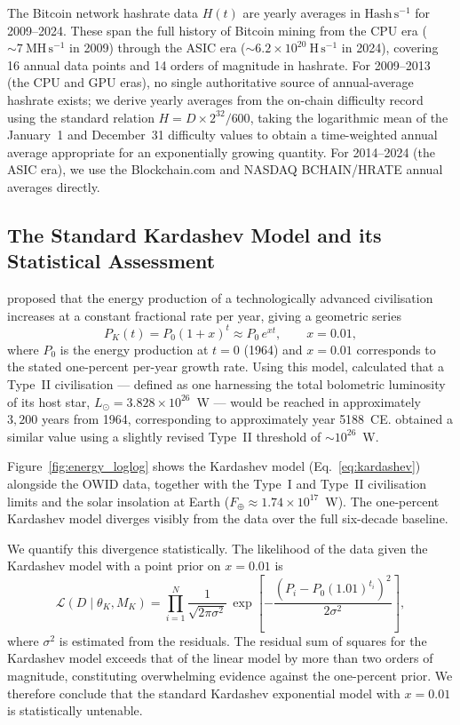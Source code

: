 The Bitcoin network hashrate data $H(t)$ are yearly averages in $\mathrm{Hash\,s^{-1}}$
for 2009--2024. These span the full history of Bitcoin mining from the CPU era
($\sim7~\mathrm{MH\,s^{-1}}$ in 2009) through the ASIC era
($\sim6.2\times10^{20}~\mathrm{H\,s^{-1}}$ in 2024), covering 16 annual data points and
14 orders of magnitude in hashrate. For 2009--2013 (the CPU and GPU eras), no single
authoritative source of annual-average hashrate exists; we derive yearly averages from
the on-chain difficulty record using the standard relation $H = D\times2^{32}/600$,
taking the logarithmic mean of the January~1 and December~31 difficulty values to obtain
a time-weighted annual average appropriate for an exponentially growing quantity. For
2014--2024 (the ASIC era), we use the Blockchain.com and NASDAQ BCHAIN/HRATE annual
averages directly.

\subsection{The Standard Kardashev Model and its Statistical Assessment}
\label{sec:standard}

\citet{Kardashev1964} proposed that the energy production of a technologically advanced
civilisation increases at a constant fractional rate per year, giving a geometric series
\begin{equation}
\label{eq:kardashev}
P_K(t) = P_0 (1+x)^t \approx P_0\, e^{xt}, \qquad x = 0.01,
\end{equation}
where $P_0$ is the energy production at $t=0$ (1964) and $x=0.01$ corresponds to the
stated one-percent per-year growth rate. Using this model, \citet{Kardashev1964}
calculated that a Type~II civilisation --- defined as one harnessing the total
bolometric luminosity of its host star, $L_\odot=3.828\times10^{26}$~W
\citep{Mamajek2015} --- would be reached in approximately $3{,}200$ years from 1964,
corresponding to approximately year 5188~CE. \citet{Sagan1973} obtained a similar value
using a slightly revised Type~II threshold of $\sim10^{26}$~W.

Figure~\ref{fig:energy_loglog} shows the Kardashev model (Eq.~\ref{eq:kardashev})
alongside the OWID data, together with the Type~I and Type~II civilisation limits and
the solar insolation at Earth ($F_\oplus\approx1.74\times10^{17}$~W). The one-percent
Kardashev model diverges visibly from the data over the full six-decade baseline.

We quantify this divergence statistically. The likelihood of the data given the
Kardashev model with a point prior on $x=0.01$ is
\begin{equation}
\label{eq:like}
\mathcal{L}(D \mid \theta_K, M_K) = \prod_{i=1}^{N}
\frac{1}{\sqrt{2\pi\sigma^2}}\,
\exp\!\left[ -\frac{\left(P_i - P_0 (1.01)^{t_i}\right)^2}{2\sigma^2} \right],
\end{equation}
where $\sigma^2$ is estimated from the residuals. The residual sum of squares for the
Kardashev model exceeds that of the linear model by more than two orders of magnitude,
constituting overwhelming evidence against the one-percent prior. We therefore conclude
that the standard Kardashev exponential model with $x=0.01$ is statistically untenable.

